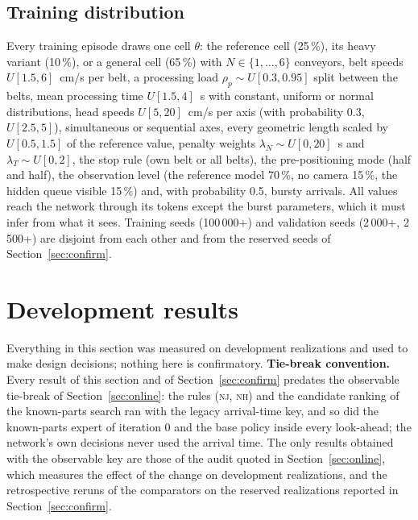 \documentclass[11pt,a4paper]{article}
\theoremstyle{plain}
\theoremstyle{definition}
\theoremstyle{remark}
\newcommand{\nj}{\textsc{nj}}
\newcommand{\nh}{\textsc{nh}}
\begin{document}
\subsection{Training distribution}\label{sec:dist}
Every training episode draws one cell $\theta$: the reference cell (25\,\%), its heavy
variant (10\,\%), or a general cell (65\,\%) with $N\in\{1,\dots,6\}$ conveyors, belt
speeds $U[1.5,6]$~cm/s per belt, a processing load $\rho_p\sim U[0.3,0.95]$ split between
the belts, mean processing time $U[1.5,4]$~s with constant, uniform or normal
distributions, head speeds $U[5,20]$~cm/s per axis (with probability 0.3, $U[2.5,5]$),
simultaneous or sequential axes, every geometric length scaled by $U[0.5,1.5]$ of the
reference value, penalty weights $\lambda_N\sim U[0,20]$~s and $\lambda_T\sim U[0,2]$, the
stop rule (own belt or all belts), the pre-positioning mode (half and half), the
observation level (the reference model 70\,\%, no camera 15\,\%, the hidden queue visible
15\,\%) and, with probability 0.5, bursty arrivals. All values reach the network through
its tokens except the burst parameters, which it must infer from what it sees. Training
seeds (100\,000+) and validation seeds (2\,000+, 2\,500+) are disjoint from each other and
from the reserved seeds of Section~\ref{sec:confirm}.

\section{Development results}\label{sec:dev}
Everything in this section was measured on development realizations and used to make
design decisions; nothing here is confirmatory. \textbf{Tie-break convention.} Every
result of this section and of Section~\ref{sec:confirm} predates the observable
tie-break of Section~\ref{sec:online}: the rules (\nj, \nh) and the candidate ranking of
the known-parts search ran with the legacy arrival-time key, and so did the known-parts
expert of iteration 0 and the base policy inside every look-ahead; the network's own
decisions never used the arrival time. The only results obtained with the observable
key are those of the audit quoted in Section~\ref{sec:online}, which measures the
effect of the change on development realizations, and the retrospective reruns of the
comparators on the reserved realizations reported in Section~\ref{sec:confirm}.
\end{document}
